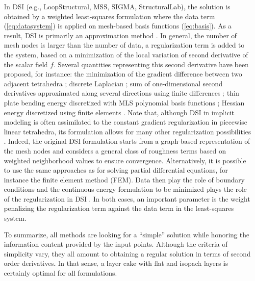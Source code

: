 \documentclass[preprint]{ring20}
\begin{document}
In DSI (e.g., LoopStructural, MSS, SIGMA, StructuralLab), the solution is obtained by a weighted least-squares formulation where the data term (\ref{eq:datasystem}) is applied on mesh-based basis functions (\ref{eq:basis}). As a result, DSI is primarily an approximation method \citep[but exact interpolation can be obtained if required by including the points in the mesh and constraining the target values, ][]{Mallet1992CD}. 
In general, the number of mesh nodes is larger than the number of data, a regularization term is added to the system, based on a minimization of the local variation of second derivative of the scalar field $f$. Several quantities representing this second derivative have been proposed, for instance: 
the minimization of the gradient difference between two adjacent tetrahedra \citep{Frank2007CG}; 
discrete Laplacian \citep{Irakarama2021MG,Irakarama2022CD}; 
sum of one-dimensional second derivatives approximated along several directions using finite differences \citep{Irakarama2021MG}; 
thin plate bending energy discretized with MLS polynomial basis functions \citep{Renaudeau2019MG}; Hessian energy discretized using finite elements \citep{Irakarama2022CD}. 
Note that, although DSI in implicit modeling is often assimilated to the constant gradient regularization in piecewise linear tetrahedra, its formulation allows for many other regularization possibilities \citep{Mallet1992CD}. Indeed, the original DSI formulation starts from a graph-based representation of the mesh nodes and considers a general class of roughness terms based on weighted neighborhood values to ensure convergence. 
Alternatively, it is possible to use the same approaches as for solving partial differential equations, for instance the finite element method (FEM). Data then play the role of boundary conditions and the continuous energy formulation to be minimized plays the role of the regularization in DSI \citep{Renaudeau2019MG}. In both cases, an important parameter is the weight penalizing the regularization term against the data term in the least-squares system. 

To summarize, all methods are looking for a ``simple'' solution while honoring the information content provided by the input points. Although the criteria of simplicity vary, they all amount to obtaining a regular solution in terms of second order derivatives. In that sense, a layer cake with flat and isopach layers is certainly optimal for all formulations. 
\end{document}

